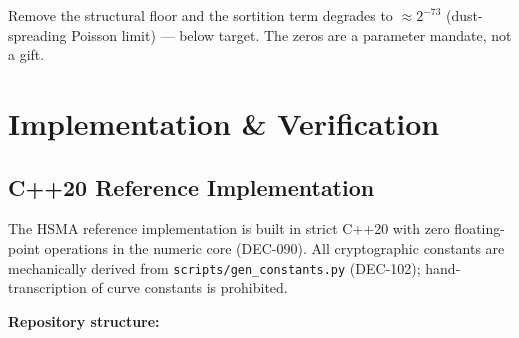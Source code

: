 \documentclass[11pt, a4paper]{article}
\begin{document}
Remove the structural floor and the sortition term degrades to $\approx 2^{-73}$ (dust-spreading Poisson limit) --- below target. The zeros are a parameter mandate, not a gift.

\section{Implementation \& Verification}

\subsection{C++20 Reference Implementation}

The HSMA reference implementation is built in strict C++20 with zero floating-point operations in the numeric core (DEC-090). All cryptographic constants are mechanically derived from \texttt{scripts/gen\_constants.py} (DEC-102); hand-transcription of curve constants is prohibited.

\textbf{Repository structure:}
\end{document}
